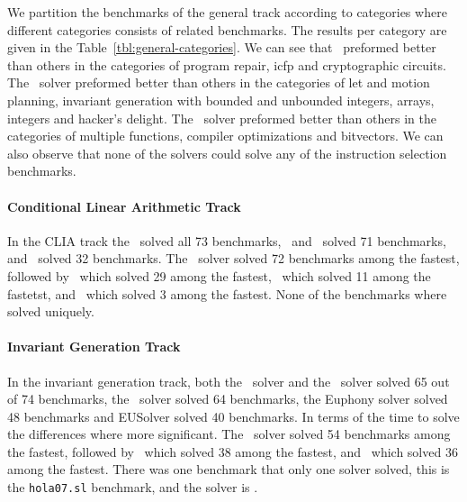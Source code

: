 We partition the benchmarks of the general track according to categories where different categories consists of related benchmarks. The results per category are given in the Table~\ref{tbl:general-categories}. We can see that \eusolvernew\ preformed better than others in the categories of program repair, icfp and cryptographic circuits. The \cvcnew\ solver preformed better than others in the categories of let and motion planning, invariant generation with bounded and unbounded integers, arrays, integers and hacker's delight. The \euphony\ solver preformed better than others in the categories of  multiple functions, compiler optimizations and bitvectors. We can also observe that none of the solvers could solve any of the instruction selection benchmarks. 






\paragraph{Conditional Linear Arithmetic Track}
In the CLIA track the \cvcnew\ solved all 73 benchmarks, \euphony\ and \eusolvernew\ solved 71 benchmarks, and \dryd\ solved 32 benchmarks. The \cvcnew\ solver solved 72 benchmarks among the fastest, followed by \eusolvernew\ which solved 29 among the fastest, \euphony\ which solved 11 among the fastetst, and \dryd\ which solved 3 among the fastest. None of the benchmarks where solved uniquely.

\paragraph{Invariant Generation Track}
In the invariant generation  track, both the \lig\ solver and the \cvcnew\ solver solved 65 out of 74 benchmarks, the \dryd\ solver solved 64 benchmarks, the Euphony solver solved 48 benchmarks and EUSolver solved 40 benchmarks. In terms of the time to solve the differences where more significant. The \lig\ solver solved 54 benchmarks among the fastest, followed by \cvcnew\ which solved 38 among the fastest, and \dryd\
which solved 36 among the fastest. There was one benchmark that only one solver solved, this is the \texttt{hola07.sl} benchmark, and the solver is \lig. 


